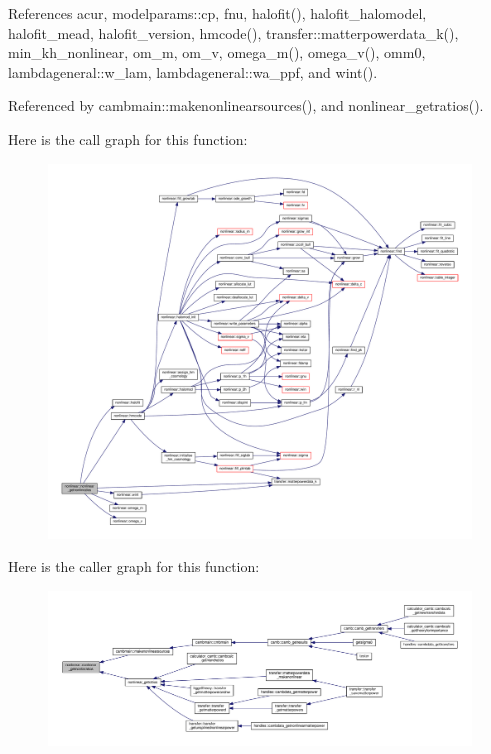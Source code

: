 References acur, modelparams\+::cp, fnu, halofit(), halofit\+\_\+halomodel, halofit\+\_\+mead, halofit\+\_\+version, hmcode(), transfer\+::matterpowerdata\+\_\+k(), min\+\_\+kh\+\_\+nonlinear, om\+\_\+m, om\+\_\+v, omega\+\_\+m(), omega\+\_\+v(), omm0, lambdageneral\+::w\+\_\+lam, lambdageneral\+::wa\+\_\+ppf, and wint().



Referenced by cambmain\+::makenonlinearsources(), and nonlinear\+\_\+getratios().

Here is the call graph for this function\+:
\nopagebreak
\begin{figure}[H]
\begin{center}
\leavevmode
\includegraphics[width=350pt]{namespacenonlinear_a0ed6b8f43af3b8a2cb369df5c247ca1f_cgraph}
\end{center}
\end{figure}
Here is the caller graph for this function\+:
\nopagebreak
\begin{figure}[H]
\begin{center}
\leavevmode
\includegraphics[width=350pt]{namespacenonlinear_a0ed6b8f43af3b8a2cb369df5c247ca1f_icgraph}
\end{center}
\end{figure}
\mbox{\label{namespacenonlinear_ada72232da7963dc507bfa2f4d346e7ec}} 

